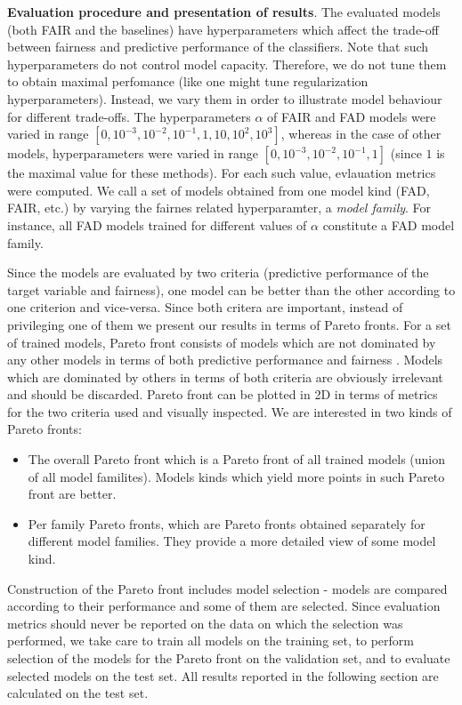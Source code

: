 \documentclass[preprint,12pt]{elsarticle}
\begin{document}
\textbf{Evaluation procedure and presentation of results}. The evaluated models (both FAIR and the baselines) have hyperparameters which affect the trade-off between fairness and predictive performance of the classifiers. Note that such hyperparameters do not control model capacity. Therefore, we do not tune them to obtain maximal perfomance (like one might tune regularization hyperparameters). Instead, we vary them in order to illustrate model behaviour for different trade-offs. The hyperparameters $\alpha$ of FAIR and FAD models were varied in range $[0, 10^{-3}, 10^{-2}, 10^{-1}, 1, 10, 10^{2}, 10^{3}]$, whereas in the case of other models, hyperparameters were varied in range $[0, 10^{-3}, 10^{-2}, 10^{-1}, 1]$ (since $1$ is the maximal value for these methods). For each such value, evlauation metrics were computed. We call a set of models obtained from one model kind (FAD, FAIR, etc.) by varying the fairnes related hyperparamter, a {\em model family}. For instance, all FAD models trained for different values of $\alpha$ constitute a FAD model family.

Since the models are evaluated by two criteria (predictive performance of the target variable and fairness), one model can be better than the other according to one criterion and vice-versa. Since both critera are important, instead of privileging one of them we present our results in terms of Pareto fronts. For a set of trained models, Pareto front consists of models which are not dominated by any other models in terms of both predictive performance and fairness \cite{marler2004survey}. Models which are dominated by others in terms of both criteria are obviously irrelevant and should be discarded. Pareto front can be plotted in 2D in terms of metrics for the two criteria used and visually inspected. We are interested in two
kinds of Pareto fronts:
\begin{itemize}
\item The overall Pareto front which is a Pareto front of all trained models (union of all model familites). Models kinds which yield more points in such Pareto front are better.
\item Per family Pareto fronts, which are Pareto fronts obtained separately for different model families. They provide a more detailed view of some model kind.
\end{itemize}

Construction of the Pareto front includes model selection - models are compared according to their performance and some of them are selected. Since evaluation metrics should never be reported on the data on which the selection was performed, we take care to train all models on the training set, to perform selection of the models for the Pareto front on the validation set, and to evaluate selected models on the test set. All results reported in the following section are calculated on the test set.
\end{document}
